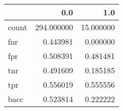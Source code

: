 \begin{tabular}{lrr}
\toprule
{} &         0.0 &        1.0 \\
\midrule
count &  294.000000 &  15.000000 \\
fnr   &    0.443981 &   0.000000 \\
fpr   &    0.508391 &   0.481481 \\
tnr   &    0.491609 &   0.185185 \\
tpr   &    0.556019 &   0.555556 \\
bacc  &    0.523814 &   0.222222 \\
\bottomrule
\end{tabular}
